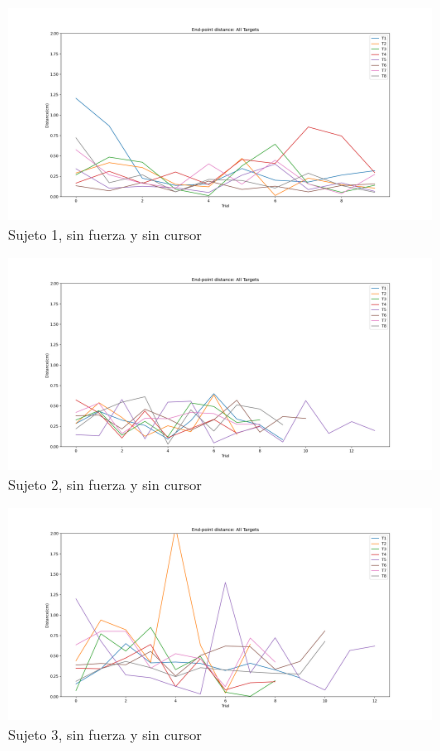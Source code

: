 \documentclass[a4paper,11pt, oneside]{book}
\begin{document}
\begin{figure}[H]
	\includegraphics[width=\linewidth]{sujeto1/no_force_no_cursor/evolution_distance}
	\caption{Sujeto 1, sin  fuerza y sin cursor}
	\label{1-3-3}
\end{figure}
\begin{figure}[H]
	\includegraphics[width=\linewidth]{sujeto2/no_force_no_cursor/evolution_distance}
	\caption{Sujeto 2, sin  fuerza y sin cursor}
	\label{2-3-3}
\end{figure}
\begin{figure}[H]
	\includegraphics[width=\linewidth]{sujeto3/no_force_no_cursor/evolution_distance}
	\caption{Sujeto 3, sin  fuerza y sin cursor}
	\label{3-3-3}
\end{figure}
\end{document}
